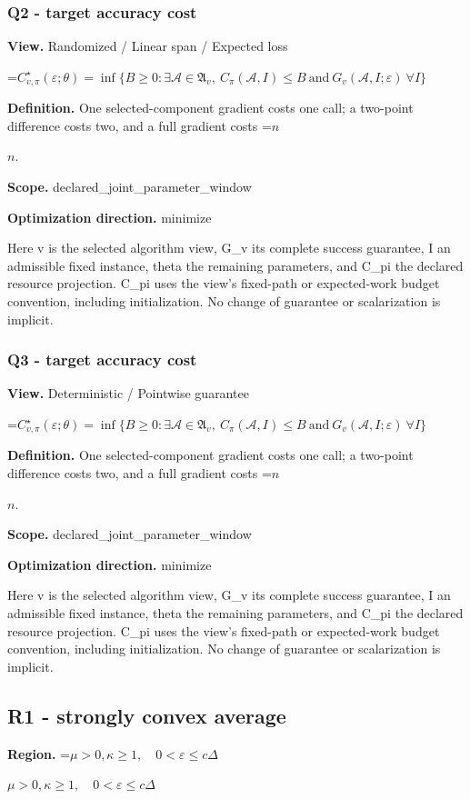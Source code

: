 \documentclass[10pt,a4paper]{article}
\newcommand{\AtlasMath}[1]{\par\begingroup\centering\setbox0=\hbox{$\displaystyle #1$}\ifdim\wd0>1.4\linewidth\typeout{ATLAS WIDE FORMULA: \the\wd0}\fi\ifdim\wd0>\linewidth\resizebox{\linewidth}{!}{\box0}\else\box0\fi\par\endgroup}
\newcommand{\AtlasInlineMath}[1]{\begingroup\setbox0=\hbox{$#1$}\ifdim\wd0>.4\linewidth\endgroup\AtlasMath{#1}\else\endgroup$#1$\fi}
\begin{document}
\subsubsection{Q2 - target accuracy cost}
\textbf{View.} Randomized / Linear span / Expected loss

\AtlasMath{C^\star_{v,\pi}(\varepsilon;\theta)=\inf\{B\ge0:\exists\mathcal A\in\mathfrak A_v,\ C_\pi(\mathcal A,I)\le B\ \text{and}\ G_v(\mathcal A,I;\varepsilon)\ \forall I\}}
\textbf{Definition.} One selected-component gradient costs one call; a two-point difference costs two, and a full gradient costs \AtlasInlineMath{n}.

\textbf{Scope.} declared\_joint\_parameter\_window

\textbf{Optimization direction.} minimize

Here v is the selected algorithm view, G\_v its complete success guarantee, I an admissible fixed instance, theta the remaining parameters, and C\_pi the declared resource projection. C\_pi uses the view's fixed-path or expected-work budget convention, including initialization. No change of guarantee or scalarization is implicit.

\subsubsection{Q3 - target accuracy cost}
\textbf{View.} Deterministic / Pointwise guarantee

\AtlasMath{C^\star_{v,\pi}(\varepsilon;\theta)=\inf\{B\ge0:\exists\mathcal A\in\mathfrak A_v,\ C_\pi(\mathcal A,I)\le B\ \text{and}\ G_v(\mathcal A,I;\varepsilon)\ \forall I\}}
\textbf{Definition.} One selected-component gradient costs one call; a two-point difference costs two, and a full gradient costs \AtlasInlineMath{n}.

\textbf{Scope.} declared\_joint\_parameter\_window

\textbf{Optimization direction.} minimize

Here v is the selected algorithm view, G\_v its complete success guarantee, I an admissible fixed instance, theta the remaining parameters, and C\_pi the declared resource projection. C\_pi uses the view's fixed-path or expected-work budget convention, including initialization. No change of guarantee or scalarization is implicit.

\subsection{R1 - strongly convex average}
\textbf{Region.} \AtlasInlineMath{\mu>0,\kappa\ge1,\quad0<\varepsilon\le c\Delta}
\end{document}
